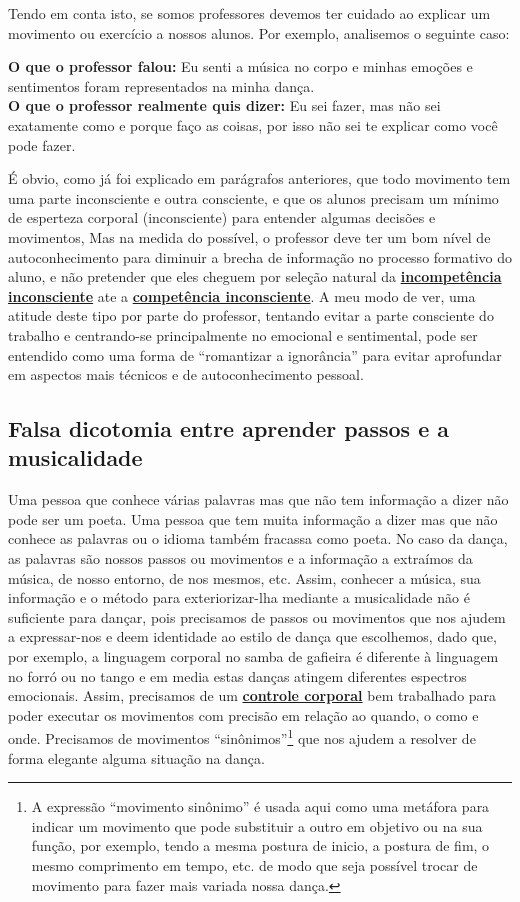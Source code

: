 Tendo em conta isto, se somos professores devemos ter cuidado ao explicar 
um movimento ou exercício a nossos alunos. 
Por exemplo, analisemos o seguinte caso:
\begin{citando}%
\textbf{O que o professor falou:} Eu senti a música no corpo e 
minhas emoções e sentimentos foram representados na minha dança.\\
\textbf{O que o professor realmente quis dizer:} Eu sei fazer, 
mas não sei exatamente como e porque faço as coisas, 
por isso não sei te explicar como você pode fazer.
\end{citando}
É obvio, como já foi explicado em parágrafos anteriores,
que todo movimento tem uma parte inconsciente e outra consciente,
e que os alunos precisam um mínimo de esperteza corporal (inconsciente) 
para entender algumas decisões e movimentos,
Mas na medida do possível, o professor deve ter um bom nível de autoconhecimento 
para diminuir a brecha de informação no processo formativo do aluno,
e não pretender que eles cheguem por seleção natural da 
\hyperref[ref:IncompetenciaInconsciente]{\textbf{incompetência inconsciente}}
ate a \hyperref[ref:CompetenciaInconsciente]{\textbf{competência inconsciente}}.
A meu modo de ver, uma atitude deste tipo por parte do professor, tentando evitar a parte consciente do trabalho 
e centrando-se principalmente no emocional e sentimental,   
pode ser entendido como uma forma de ``romantizar a ignorância'' 
para evitar aprofundar em aspectos mais técnicos
e de autoconhecimento pessoal.


\subsection{Falsa dicotomia entre aprender passos e a musicalidade}
\label{ref:pasosvsmusicalidade}
Uma pessoa que conhece várias palavras mas que não tem informação a dizer não pode ser um poeta.
Uma pessoa que tem muita informação a dizer mas que não conhece as palavras ou o idioma também fracassa como poeta. 
No caso da dança, as palavras são nossos passos ou movimentos e a informação 
a extraímos da música, de nosso entorno, de nos mesmos, etc. Assim,
conhecer a música, sua informação e o método para exteriorizar-lha mediante a musicalidade 
não é suficiente para dançar, 
pois precisamos de passos ou movimentos que nos ajudem a expressar-nos e deem identidade ao estilo de dança que escolhemos,
dado que, por exemplo, a linguagem corporal no samba de gafieira é diferente à linguagem no forró ou no tango
e em media estas danças atingem diferentes espectros emocionais.
Assim, precisamos de um \hyperref[sec:BodyControl]{\textbf{controle corporal}} 
bem trabalhado para poder executar os movimentos com precisão em relação ao
quando, o como e onde. 
Precisamos de movimentos ``sinônimos''\footnote{A 
expressão ``movimento sinônimo'' é usada aqui como uma metáfora para indicar um movimento
que pode substituir a outro em objetivo ou na sua função, por exemplo, tendo
a mesma postura de inicio, a postura de fim, o mesmo comprimento em tempo, etc.
de modo que seja possível trocar de movimento para fazer mais variada nossa dança.} 
que nos ajudem a resolver de forma elegante alguma situação na dança.

